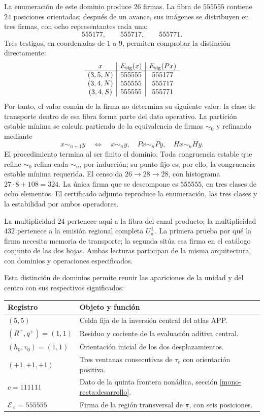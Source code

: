 La enumeración de este dominio produce \(26\) firmas. La fibra de
\(555555\) contiene \(24\) posiciones orientadas; después de un
avance, sus imágenes se distribuyen en tres firmas, con ocho
representantes cada una:
\[
 555177,\qquad555717,\qquad555771.
\]
Tres testigos, en coordenadas de \(1\) a \(9\), permiten comprobar
la distinción directamente:
\[
\begin{array}{c|c|c}
x&E_{\rm sig}(x)&E_{\rm sig}(Px)\\\hline
(3,5,N)&555555&555177\\
(3,4,N)&555555&555717\\
(3,4,S)&555555&555771
\end{array}
\]
Por tanto, el valor común de la firma no determina su siguiente valor:
la clase de transporte dentro de esa fibra forma parte del dato
operativo. La partición estable mínima se calcula partiendo de la
equivalencia de firmas \(\sim_0\) y refinando mediante
\[
 x\sim_{n+1}y\quad\Longleftrightarrow\quad
 x\sim_n y,\quad Px\sim_n Py,\quad Hx\sim_n Hy.
\]
El procedimiento termina al ser finito el dominio. Toda congruencia
estable que refine \(\sim_0\) refina cada \(\sim_n\), por inducción;
su punto fijo es, por ello, la congruencia estable mínima requerida.
El censo da \(26\to28\to28\), con histograma
\(27\cdot8+108=324\). La única firma que se descompone es
\(555555\), en tres clases de ocho elementos. El certificado adjunto
reproduce la enumeración, las tres clases y la estabilidad por ambos
operadores\cite{hmtedicionintegral}.

La multiplicidad \(24\) pertenece aquí a la fibra del canal producto;
la multiplicidad \(432\) pertenece a la emisión regional completa
\(U_\pi^\perp\). La primera prueba por qué la firma necesita memoria
de transporte; la segunda sitúa esa firma en el catálogo conjunto de
las dos hojas. Ambas lecturas participan de la misma arquitectura,
con dominios y operaciones especificados.

Esta distinción de dominios permite reunir las apariciones de la unidad
y del centro con sus respectivos significados:
\begin{center}
\small
\begin{tabularx}{\textwidth}{@{}lX@{}}
\toprule
Registro & Objeto y función \\
\midrule
\((5,5)\) & Celda fija de la inversión central del atlas APP.\\
\((R^+,q^+)=(1,1)\) & Residuo y cociente de la evaluación aditiva central.\\
\((h_0,v_0)=(1,1)\) & Orientación inicial de los dos desplazamientos.\\
\((+1,+1,+1)\) & Tres ventanas consecutivas de \(\tau_e\) con orientación positiva.\\
\(c=111111\) & Dato de la quinta frontera nonádica, sección \ref{mono-recta:desarrollo}.\\
\(\mathcal E_\times=555555\) & Firma de la región transversal de \(\pi\), con seis posiciones.\\
\bottomrule
\end{tabularx}
\end{center}


